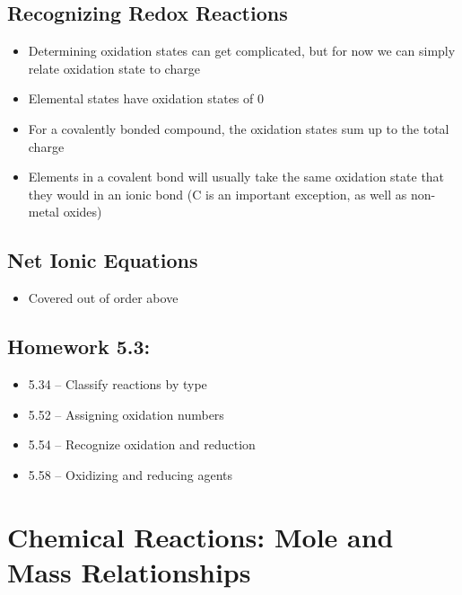 \documentclass[12pt, openany, letterpaper]{memoir}
\begin{document}
\section{Recognizing Redox Reactions}
\begin{itemize}
	\item Determining oxidation states can get complicated, but for now we can simply relate oxidation state to charge
	\item Elemental states have oxidation states of 0
	\item For a covalently bonded compound, the oxidation states sum up to the total charge
	\item Elements in a covalent bond will usually take the same oxidation state that they would in an ionic bond (C is an important exception, as well as non-metal oxides)
\end{itemize}

\section{Net Ionic Equations}
\begin{itemize}
	\item Covered out of order above
\end{itemize}

\section*{Homework 5.3:}
\begin{itemize}
	\item 5.34 -- Classify reactions by type
	\item 5.52 -- Assigning oxidation numbers
	\item 5.54 -- Recognize oxidation and reduction
	\item 5.58 -- Oxidizing and reducing agents
\end{itemize}

\chapter{Chemical Reactions: Mole and Mass Relationships}
\end{document}

